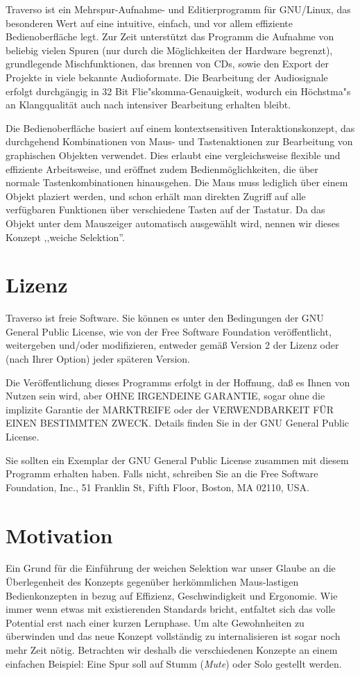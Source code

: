 Traverso ist ein Mehrspur-Aufnahme- und Editierprogramm für GNU/Linux, das besonderen Wert auf eine intuitive, einfach, und vor allem effiziente Bedienoberfläche legt. Zur Zeit unterstützt das Programm die Aufnahme von beliebig vielen Spuren (nur durch die Möglichkeiten der Hardware begrenzt), grundlegende Mischfunktionen, das brennen von CDs, sowie den Export der Projekte in viele bekannte Audioformate. Die Bearbeitung der Audiosignale erfolgt durchgängig in 32 Bit Flie"skomma-Genauigkeit, wodurch ein Höchstma"s an Klangqualität auch nach intensiver Bearbeitung erhalten bleibt.

Die Bedienoberfläche basiert auf einem kontextsensitiven Interaktionskonzept, das durchgehend Kombinationen von Maus- und Tastenaktionen zur Bearbeitung von graphischen Objekten verwendet. Dies erlaubt eine vergleichsweise flexible und effiziente Arbeitsweise, und eröffnet zudem Bedienmöglichkeiten, die über normale Tastenkombinationen hinausgehen. Die Maus muss lediglich über einem Objekt plaziert werden, und schon erhält man direkten Zugriff auf alle verfügbaren Funktionen über verschiedene Tasten auf der Tastatur. Da das Objekt unter dem Mauszeiger automatisch ausgewählt wird, nennen wir dieses Konzept ,,weiche Selektion''.

\section{Lizenz}
Traverso ist freie Software. Sie können es unter den Bedingungen der GNU General Public License, wie von der Free Software Foundation veröffentlicht, weitergeben und/oder modifizieren, entweder gemäß Version 2 der Lizenz oder (nach Ihrer Option) jeder späteren Version. 

Die Veröffentlichung dieses Programms erfolgt in der Hoffnung, daß es Ihnen von Nutzen sein wird, aber OHNE IRGENDEINE GARANTIE, sogar ohne die implizite Garantie der MARKTREIFE oder der VERWENDBARKEIT FÜR EINEN BESTIMMTEN ZWECK. Details finden Sie in der GNU General Public License.

Sie sollten ein Exemplar der GNU General Public License zusammen mit diesem Programm erhalten haben. Falls nicht, schreiben Sie an die Free Software Foundation, Inc., 51 Franklin St, Fifth Floor, Boston, MA 02110, USA.

\section{Motivation}
Ein Grund für die Einführung der weichen Selektion war unser Glaube an die Überlegenheit des Konzepts gegenüber herkömmlichen Maus-lastigen Bedienkonzepten in bezug auf Effizienz, Geschwindigkeit und Ergonomie. Wie immer wenn etwas mit existierenden Standards bricht, entfaltet sich das volle Potential erst nach einer kurzen Lernphase. Um alte Gewohnheiten zu überwinden und das neue Konzept vollständig zu internalisieren ist sogar noch mehr Zeit nötig. Betrachten wir deshalb die verschiedenen Konzepte an einem einfachen Beispiel: Eine Spur soll auf Stumm (\textit{Mute}) oder Solo gestellt werden.

